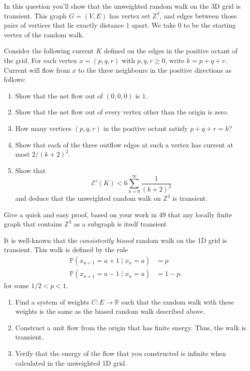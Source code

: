 \documentclass[12 pt, letterpaper]{hmcpset}
\begin{document}
\begin{problem}[49.]
	In this question you'll show that the unweighted random walk on the 3D grid is transient. This graph $G = (V, E)$ has vertex set $\mathbb{Z}^{3}$, and edges between those pairs of vertices that lie exactly distance $1$ apart. We take $0$ to be the starting vertex of the random walk.

	Consider the following current $K$ defined on the edges in the positive octant of the grid. For each vertex $x = (p, q, r)$ with $p, q, r \ge 0$, write $k = p + q + r$. Current will flow from $x$ to the three neighbours in the positive directions as follows:

	\begin{enumerate}
		\item Show that the net flow out of $(0, 0, 0)$ is $1$.
		\item Show that the net flow out of every vertex other than the origin is zero.
		\item How many vertices $(p, q, r)$ in the positive octant satisfy $p + q + r = k$?
		\item Show that each of the three outflow edges at such a vertex has current at most $2 / (k + 2)^{2}$.
		\item Show that
			\[
				\mathcal{E}'(K) < 6 \sum_{k = 0}^{\infty} \frac{1}{(k + 2)^{2}}
			\]
			and deduce that the unweighted random walk on $\mathbb{Z}^{3}$ is transient.
	\end{enumerate}	
\end{problem}

\pagebreak

\begin{problem}[50.]
	Give a quick and easy proof, based on your work in 49 that any locally finite graph that contains $\mathbb{Z}^{3}$ as a subgraph is itself transient
\end{problem}

\pagebreak


\begin{problem}[51.]
	It is well-known that the \emph{consistently biased} random walk on the 1D grid is transient. This walk is defined by the rule
	\begin{align*}
		\mathbb{P}(x_{n + 1} = a + 1 \mid x_{n} = a) & = p \\
		\mathbb{P}(x_{n + 1} = a - 1 \mid x_{n} = a) & = 1 - p.
	\end{align*}
	for some $1 / 2 < p < 1$.
	\begin{enumerate}
		\item Find a system of weights $C : E \to \mathbb{R}$ such that the random walk with these weights is the same as the biased random walk described above.

		\item Construct a unit flow from the origin that has finite energy. Thus, the walk is transient.

		\item Verify that the energy of the flow that you constructed is infinite when calculated in the unweighted 1D grid.
	\end{enumerate}
\end{problem}
\end{document}
